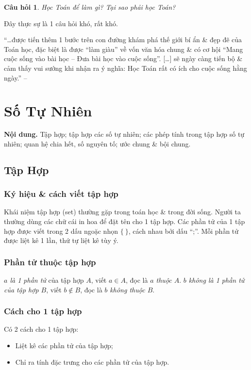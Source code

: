 \documentclass{article}
\numberwithin{equation}{section}
\newtheorem{question}{Câu hỏi}[section]
\begin{document}
\begin{question}
	Học Toán để làm gì? Tại sao phải học Toán?
\end{question}
Đây thực sự là 1 câu hỏi khó, rất khó.

``\ldots được tiến thêm 1 bước trên con đường khám phá thế giới bí ẩn \& đẹp đẽ của Toán học, đặc biệt là được ``làm giàu'' về vốn văn hóa chung \& có cơ hội ``Mang cuộc sống vào bài học -- Đưa bài học vào cuộc sống''. [\ldots] sẽ ngày càng tiến bộ \& cảm thấy vui sướng khi nhận ra ý nghĩa: Học Toán rất có ích cho cuộc sống hằng ngày.'' -- \cite[p. 1]{Thai_Anh_Dat_Ha_Loan_Nam_Quang_Toan_6_tap_1} 

\section{Số Tự Nhiên}
\textbf{Nội dung.} Tập hợp; tập hợp các số tự nhiên; các phép tính trong tập hợp số tự nhiên; quan hệ chia hết, số nguyên tố; ước chung \& bội chung.

\subsection{Tập Hợp}

\subsubsection{Ký hiệu \& cách viết tập hợp}
Khái niệm tập hợp (set) thường gặp trong toán học \& trong đời sống. Người ta thường dùng các chữ cái in hoa để đặt tên cho 1 tập hợp. Các phần tử của 1 tập hợp được viết trong 2 dấu ngoặc nhọn $\{\ \}$, cách nhau bởi dấu ``;''. Mỗi phần tử được liệt kê 1 lần, thứ tự liệt kê tùy ý.

\subsubsection{Phần tử thuộc tập hợp}
\textit{$a$ là 1 phần tử} của tập hợp $A$, viết $a\in A$, đọc là \textit{$a$ thuộc $A$}. \textit{$b$ không là 1 phần tử của tập hợp $B$}, viết $b\notin B$, đọc là \textit{$b$ không thuộc $B$}.

\subsubsection{Cách cho 1 tập hợp}
Có 2 cách cho 1 tập hợp:
\begin{itemize}
	\item Liệt kê các phần tử của tập hợp;
	\item Chỉ ra tính đặc trưng cho các phần tử của tập hợp.
\end{itemize}
\end{document}
